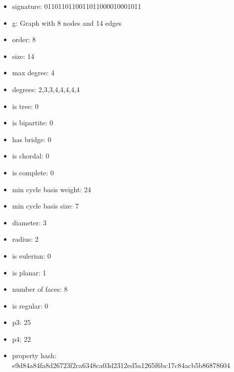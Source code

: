 \begin{itemize}
\item signature: 0110110110011011000010001011
\item g: Graph with 8 nodes and 14 edges
\item order: 8
\item size: 14
\item max degree: 4
\item degrees: 2,3,3,4,4,4,4,4
\item is tree: 0
\item is bipartite: 0
\item has bridge: 0
\item is chordal: 0
\item is complete: 0
\item min cycle basis weight: 24
\item min cycle basis size: 7
\item diameter: 3
\item radius: 2
\item is eulerian: 0
\item is planar: 1
\item number of faces: 8
\item is regular: 0
\item p3: 25
\item p4: 22
\item property hash: e9d84a84fa8d26723f2ca6348ca03d2312ed5a1265f6bc17c84acb5b86878604
\end{itemize}
\newpage
\begin{figure}
\end{figure}

